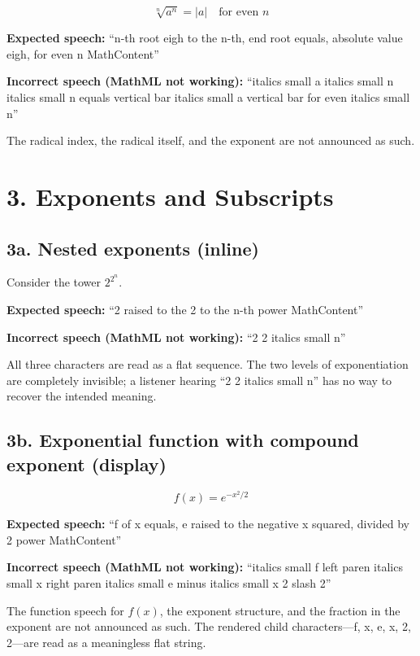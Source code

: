 \documentclass{article}
\begin{document}
\[
  \sqrt[n]{a^n} = \lvert a \rvert \quad \text{for even } n
\]

\textbf{Expected speech:} ``n-th root eigh to the n-th, end root equals, 
absolute value eigh, for even n MathContent''

\textbf{Incorrect speech (MathML not working):} ``italics small a italics small n 
italics small n equals vertical bar italics small a vertical bar for even italics small n''

The radical index, the radical itself, and the exponent are not announced as such. 

\section*{3. Exponents and Subscripts}

\subsection*{3a. Nested exponents (inline)}

Consider the tower $2^{2^n}$.

\textbf{Expected speech:} ``2 raised to the 2 to the n-th power MathContent''

\textbf{Incorrect speech (MathML not working):} ``2 2 italics small n''

All three characters are read as a flat sequence. The two levels of
exponentiation are completely invisible; a listener hearing ``2 2 italics small n'' has
no way to recover the intended meaning.

\subsection*{3b. Exponential function with compound exponent (display)}

\[
  f(x) = e^{-x^2 / 2}
\]

\textbf{Expected speech:} ``f of x equals, e raised to the negative x squared, 
divided by 2 power MathContent''

\textbf{Incorrect speech (MathML not working):} ``italics small f left paren 
italics small x right paren italics small e minus italics small x 2 slash 2''

The function speech for $f(x)$, the exponent structure, and
the fraction in the exponent are not announced as such. The rendered child
characters---f, x, e, x, 2, 2---are read as a meaningless flat string.
\end{document}
